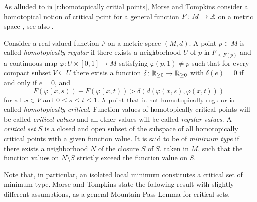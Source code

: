 As alluded to in \cref{r:homotopically critial points}, Morse and Tompkins consider a homotopical notion of critical point for a general function $F \colon M \to \mathbb{R}$ on a metric space \cite[p.~445]{Morse.1939}, see also \cite{Morse.1943}.

\begin{defi}
	Consider a real-valued function $F$ on a metric space $(M,d)$.
	A point $p \in M$ is called \emph{homotopically regular} if there exists a neighborhood $U$ of $p$ in $F_{\leq F(p)}$ and a continuous map $\varphi \colon U \times [0,1] \to M$ satisfying $\varphi(p,1) \neq p$ such that for every compact subset $V \subseteq U$ there exists a function $\delta \colon \mathbb{R}_{\geq 0} \to \mathbb{R}_{\geq 0}$ with
	$\delta(e) = 0$ if and only if $e = 0$, and
	\[
	F(\varphi(x,s)) - F(\varphi(x,t)) > \delta(d(\varphi(x,s),\varphi(x,t)))
	\]
	for all $x \in V$ and $0 \leq s \leq t \leq 1$.
	A point that is not homotopically regular is called \emph{homotopically critical}.
	Function values of homotopically critical points will be called \emph{critical values} and all other values will be called \emph{regular values}.
	A \emph{critical set} $S$ is a closed and open subset of the subspace of all homotopically critical points with a given function value.
	It is said to be of \emph{minimum type} if there exists a neighborhood $N$ of the closure $\overline{S}$ of $S$, taken in $M$, such that the function values on $N \setminus S$ strictly exceed the function value on $S$.
\end{defi}

Note that, in particular, an isolated local minimum constitutes a critical set of minimum type.
Morse and Tompkins state the following result with slightly different assumptions, as a general Mountain Pass Lemma for critical sets.


